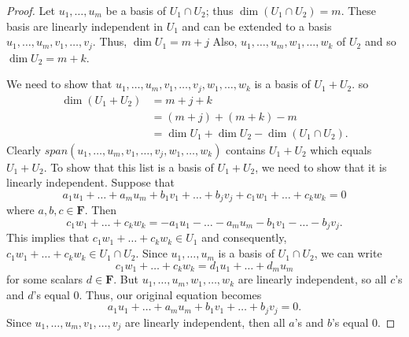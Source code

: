 \documentclass[11pt]{article}
\begin{document}
    \begin{proof}
        Let \(u_1, \dots, u_m\) be a basis of \(U_1 \cap U_2\); thus \(\dim (U_1 \cap U_2) = m\). These basis are linearly independent in $U_1$ and can be extended to a basis \(u_1, \dots, u_m, v_1, \dots, v_j\). Thus, \(\dim U_1 = m + j\) Also, \(u_1, \dots, u_m, w_1, \dots, w_k\) of $U_2$ and so \(\dim U_2 = m + k\).

        We need to show that \(u_1, \dots, u_m, v_1, \dots, v_j, w_1, \dots, w_k\) is a basis of \(U_1 + U_2\). so
        \begin{align*}
            \dim(U_1 + U_2) &= m + j + k \\
                            &= (m+j) + (m+k) - m \\
                            &= \dim U_1 + \dim U_2 - \dim (U_1 \cap U_2).
        \end{align*}
        Clearly \(span(u_1,\dots,u_m,v_1,\dots,v_j,w_1, \dots, w_k)\) contains \(U_1 + U_2\) which equals \(U_1 + U_2\). To show that this list is a basis of \(U_1 + U_2\), we need to show that it is linearly independent. Suppose that \[a_1 u_1 + \dots + a_m u_m + b_1 v_1 + \dots + b_j v_j + c_1 w_1 + \dots + c_k w_k = 0\] where \(a,b,c \in \textbf{F}\). Then \[c_1 w_1 + \dots + c_k w_k = -a_1 u_1 - \dots - a_m u_m - b_1 v_1 - \dots - b_j v_j.\] This implies that \(c_1 w_1 + \dots + c_k w_k \in U_1\) and consequently, \(c_1 w_1 + \dots + c_k w_k \in U_1 \cap U_2\). Since \(u_1, \dots, u_m\) is a basis of \(U_1 \cap U_2\), we can write \[c_1 w_1 + \dots + c_k w_k = d_1 u_1 + \dots + d_m u_m\] for some scalars \(d \in \textbf{F}\). But \(u_1, \dots, u_m, w_1, \dots, w_k\) are linearly independent, so all $c$'s and $d$'s equal 0. Thus, our original equation becomes \[ a_1 u_1 + \dots + a_m u_m + b_1 v_1 + \dots + b_j v_j = 0. \] Since \(u_1, \dots, u_m, v_1, \dots, v_j\) are linearly independent, then all $a$'s and $b$'s equal 0. 
    \end{proof}

 
    
\end{document}
